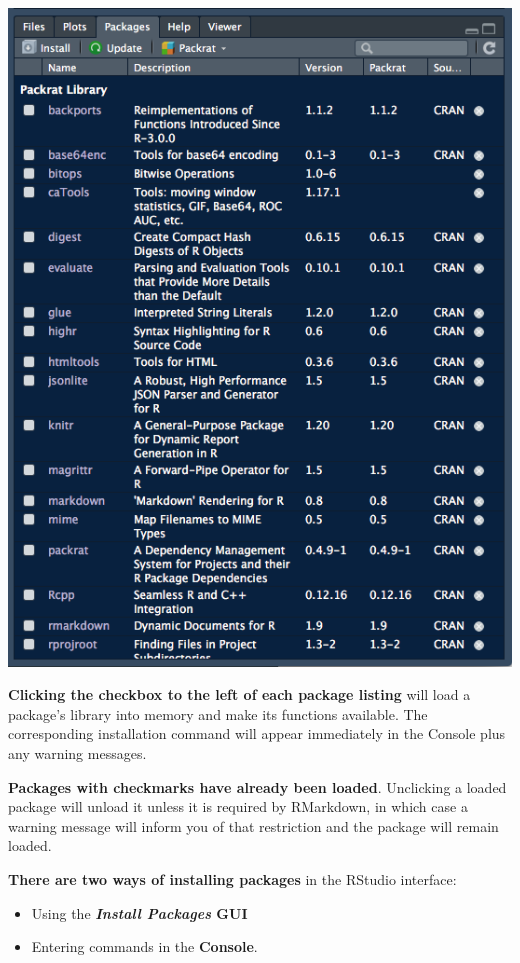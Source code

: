 \documentclass[]{book}
\providecommand{\tightlist}{%
  \setlength{\itemsep}{0pt}\setlength{\parskip}{0pt}}
\theoremstyle{definition}
\theoremstyle{definition}
\theoremstyle{definition}
\theoremstyle{remark}
\begin{document}
\includegraphics{images/RStudio_packages.png}

\textbf{Clicking the checkbox to the left of each package listing} will
load a package's library into memory and make its functions available.
The corresponding installation command will appear immediately in the
Console plus any warning messages.

\textbf{Packages with checkmarks have already been loaded}. Unclicking a
loaded package will unload it unless it is required by RMarkdown, in
which case a warning message will inform you of that restriction and the
package will remain loaded.

\textbf{There are two ways of installing packages} in the RStudio
interface:

\begin{itemize}
\tightlist
\item
  Using the \textbf{\emph{Install Packages} GUI}
\item
  Entering commands in the \textbf{Console}.
\end{itemize}
\end{document}
